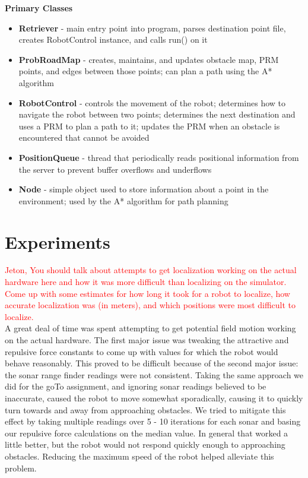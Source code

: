 \documentclass[12pt]{article}
\begin{document}
\textbf{Primary Classes}
\begin{itemize}
\item{\textbf{Retriever} - main entry point into program, parses destination point file, creates RobotControl instance, and calls run() on it}
\item{\textbf{ProbRoadMap} - creates, maintains, and updates obstacle map, PRM points, and edges between those points; 
                       can plan a path using the A* algorithm}
\item{\textbf{RobotControl} - controls the movement of the robot; determines how to navigate the robot between two points; 
                      determines the next destination and uses a PRM to plan a path to it; updates the PRM when an obstacle is encountered 
                      that cannot be avoided}
\item{\textbf{PositionQueue} - thread that periodically reads positional information from the server to prevent buffer overflows and underflows}
\item{\textbf{Node} - simple object used to store information about a point in the environment; used by the A* algorithm for path planning}
\end{itemize}


\section{Experiments}

\textcolor{red}{Jeton, You should talk about attempts to get localization working on the actual hardware here and how it was more difficult than localizing on the simulator. Come up with some estimates for how long it took for a robot to localize, how accurate localization was (in meters), and which positions were most difficult to localize. } \\ 

A great deal of time was spent attempting to get potential field motion working on the actual hardware. The first major issue was tweaking the attractive and repulsive force constants to come up with values for which the robot would behave reasonably. This proved to be difficult because of the second major issue: the sonar range finder readings were not consistent. Taking the same approach we did for the goTo assignment, and ignoring sonar readings believed to be inaccurate, caused the robot to move somewhat sporadically, causing it to quickly turn towards and away from approaching obstacles. We tried to mitigate this effect by taking multiple readings over 5 - 10 iterations for each sonar and basing our repulsive force calculations on the median value. In general that worked a little better, but the robot would not respond quickly enough to approaching obstacles. Reducing the maximum speed of the robot helped alleviate this problem.
\end{document}
